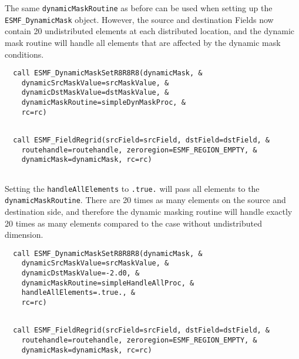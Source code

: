 
   The same {\tt dynamicMaskRoutine} as before can be used when setting up
   the {\tt ESMF\_DynamicMask} object. However, the source and destination
   Fields now contain 20 undistributed elements at each distributed location,
   and the dynamic mask routine will handle all elements that are affected
   by the dynamic mask conditions. 

 \begin{verbatim}
  call ESMF_DynamicMaskSetR8R8R8(dynamicMask, &
    dynamicSrcMaskValue=srcMaskValue, &
    dynamicDstMaskValue=dstMaskValue, &
    dynamicMaskRoutine=simpleDynMaskProc, &
    rc=rc)
 
\end{verbatim}
 

 \begin{verbatim}
  call ESMF_FieldRegrid(srcField=srcField, dstField=dstField, &
    routehandle=routehandle, zeroregion=ESMF_REGION_EMPTY, &
    dynamicMask=dynamicMask, rc=rc)
 
\end{verbatim}
 

   Setting the {\tt handleAllElements} to {\tt .true.} will pass all elements
   to the {\tt dynamicMaskRoutine}. There are 20 times as many elements
   on the source and destination side, and therefore the dynamic masking routine
   will handle exactly 20 times as many elements compared to the case without
   undistributed dimension. 

 \begin{verbatim}
  call ESMF_DynamicMaskSetR8R8R8(dynamicMask, &
    dynamicSrcMaskValue=srcMaskValue, &
    dynamicDstMaskValue=-2.d0, &
    dynamicMaskRoutine=simpleHandleAllProc, &
    handleAllElements=.true., &
    rc=rc)
 
\end{verbatim}
 

 \begin{verbatim}
  call ESMF_FieldRegrid(srcField=srcField, dstField=dstField, &
    routehandle=routehandle, zeroregion=ESMF_REGION_EMPTY, &
    dynamicMask=dynamicMask, rc=rc)
 
\end{verbatim}
 
